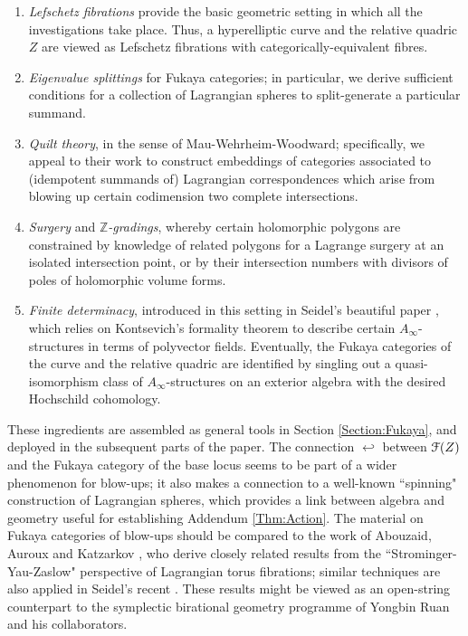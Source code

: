 \documentclass[reqno,10pt]{amsart}
\numberwithin{equation}{section}
\newcommand{\bZ}{{\mathbb Z}}
\newcommand{\scrF}{\EuScript{F}}
\theoremstyle{remark}
\begin{document}
\begin{enumerate}
\item \emph{Lefschetz fibrations}  provide the basic geometric setting in which all the investigations take place.  Thus, a hyperelliptic curve and the relative quadric $Z$ are viewed as Lefschetz fibrations with categorically-equivalent fibres.
\item \emph{Eigenvalue splittings} for Fukaya categories; in particular, we derive sufficient conditions for a collection of Lagrangian spheres to split-generate a particular summand.
\item \emph{Quilt theory}, in the sense of Mau-Wehrheim-Woodward; specifically, we appeal to their work to construct embeddings of categories associated to (idempotent summands of)  Lagrangian correspondences which arise from blowing up certain codimension two complete intersections.  
\item \emph{Surgery} and \emph{$\bZ$-gradings}, whereby certain holomorphic polygons are constrained by knowledge of related polygons for a Lagrange surgery at an isolated intersection point, or by their intersection numbers with divisors of poles of holomorphic volume forms.
\item \emph{Finite determinacy}, introduced in this setting in Seidel's beautiful paper \cite{Seidel:HMSgenus2}, which relies on Kontsevich's formality theorem to describe certain $A_{\infty}$-structures in terms of polyvector fields.  Eventually, the Fukaya categories of the curve and the relative quadric are identified by singling out a quasi-isomorphism class of $A_{\infty}$-structures on an exterior algebra with the desired Hochschild cohomology. 
\end{enumerate}

These ingredients are assembled as general tools in Section \ref{Section:Fukaya}, and deployed in the subsequent parts of the paper.  The connection $\hookleftarrow$ between $\scrF(Z)$ and  the Fukaya category of the base locus seems to be part of a wider phenomenon for blow-ups; it also makes a connection to a well-known ``spinning" construction of Lagrangian spheres, which provides a link between algebra and geometry useful for establishing Addendum \ref{Thm:Action}.   The material on Fukaya categories of blow-ups should be compared to the work of Abouzaid, Auroux and Katzarkov \cite{AAK}, who derive closely related results from the ``Strominger-Yau-Zaslow" perspective of Lagrangian torus fibrations; similar techniques are also applied in Seidel's recent \cite{Seidel:Flux}.  These results might be viewed as an open-string counterpart to the symplectic birational geometry programme of Yongbin Ruan and his collaborators.
  
\end{document}
